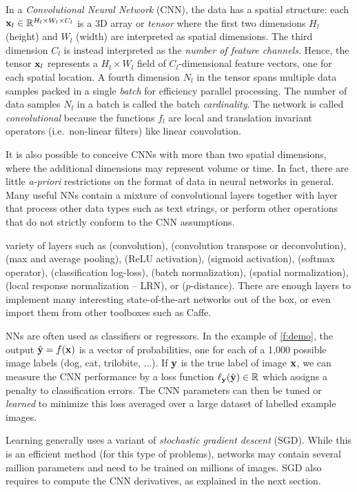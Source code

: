 In a \emph{Convolutional Neural Network} (CNN), the data has a spatial structure: each $\mathbf{x}_l\in\mathbb{R}^{H_l \times W_l \times C_l}$ is a 3D array or \emph{tensor} where the first two dimensions $H_l$ (height) and $W_l$ (width) are interpreted as spatial dimensions. The third dimension $C_l$ is instead interpreted as the \emph{number of feature channels}. Hence, the tensor $\mathbf{x}_l$ represents a $H_l \times W_l$ field of $C_l$-dimensional feature vectors, one for each spatial location. A fourth dimension $N_l$ in the tensor spans multiple data samples packed in a single \emph{batch} for efficiency parallel processing. The number of data samples $N_l$ in a batch is called the batch \emph{cardinality}. The network is called \emph{convolutional} because the functions $f_l$ are local and translation invariant operators (i.e.\ non-linear filters) like linear convolution.

It is also possible to conceive CNNs with more than two spatial dimensions, where the additional dimensions may represent volume or time. In fact, there are little \emph{a-priori} restrictions on the format of data in neural networks in general. Many useful NNs contain a mixture of convolutional layers together with layer that process other data types such as text strings, or perform other operations that do not strictly conform  to the CNN assumptions.

variety of layers such as (convolution),  (convolution transpose or deconvolution),  (max and average pooling),  (ReLU activation),  (sigmoid activation),  (softmax operator),  (classification log-loss), (batch normalization), (spatial normalization), (local response normalization -- LRN), or ($p$-distance).  There are enough layers to implement many interesting state-of-the-art networks out of the box, or even import them from other toolboxes such as Caffe. 

NNs are often used as classifiers or regressors. In the example of \cref{f:demo}, the output $\hat {\mathbf{y}} = f(\mathbf{x})$ is a vector of probabilities, one for each of a 1,000 possible image labels (dog, cat, trilobite, ...).  If $\mathbf{y}$ is the true label of image $\mathbf{x}$, we can measure the CNN performance by a loss function $\ell_{\mathbf{y}}(\hat {\mathbf{y}})  \in \mathbb{R}$ which assigns a penalty to classification errors. The CNN parameters can then be tuned or \emph{learned} to minimize this loss averaged over a large dataset of labelled example images.

Learning generally uses a variant of \emph{stochastic gradient descent} (SGD). While this is an efficient method (for this type of problems), networks may contain several million parameters and need to be trained on millions of images. SGD also requires to compute the CNN derivatives, as explained in the next section.


